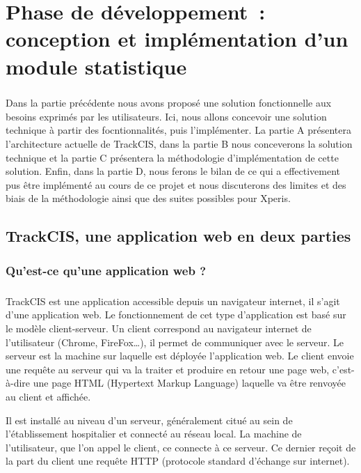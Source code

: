 \chapter{Phase de développement~: conception et implémentation d'un module
statistique}
	\paragraph{}
	Dans la partie précédente nous avons proposé une solution fonctionnelle aux
	besoins exprimés par les utilisateurs. Ici, nous allons concevoir une solution
	technique à partir des focntionnalités, puis l'implémenter. La partie A
	présentera l'architecture actuelle de TrackCIS, dans la partie B nous
	conceverons la solution technique et la partie C présentera la méthodologie
	d'implémentation de cette solution. Enfin, dans la partie D, nous ferons le
	bilan de ce qui a effectivement pus être implémenté au cours de ce projet et
	nous discuterons des limites et des biais de la méthodologie ainsi que des
	suites possibles pour Xperis.
	
	\section{TrackCIS, une application web en deux parties}
		
		\subsection{Qu'est-ce qu'une application web ?}
			\paragraph{}%
			TrackCIS est une application accessible depuis un navigateur internet, il
			s'agit d'une application web. Le fonctionnement de cet type d'application est
			basé sur le modèle client-serveur. Un client correspond au navigateur
			internet de l'utilisateur (Chrome, FireFox\ldots), il permet de communiquer
			avec le serveur. Le serveur est la machine sur
			laquelle est déployée l'application web. Le client envoie une requête au
			serveur qui va la traiter et produire en retour une page web, c'est-à-dire
			une page HTML (Hypertext Markup Language) laquelle va être renvoyée au client
			et affichée.
			
			Il est installé au niveau d'un serveur,
			généralement citué au sein de l'établissement hospitalier et connecté au
			réseau local. La machine de l'utilisateur, que l'on appel le client, ce
			connecte à ce serveur. Ce dernier reçoit de la part du client une requête
			HTTP (protocole standard d'échange sur internet).
			
